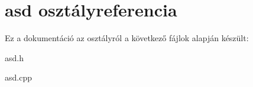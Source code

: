 \hypertarget{classasd}{}\section{asd osztályreferencia}
\label{classasd}


Ez a dokumentáció az osztályról a következő fájlok alapján készült\+:\begin{DoxyCompactItemize}
\item 
asd.\+h\item 
asd.\+cpp\end{DoxyCompactItemize}
